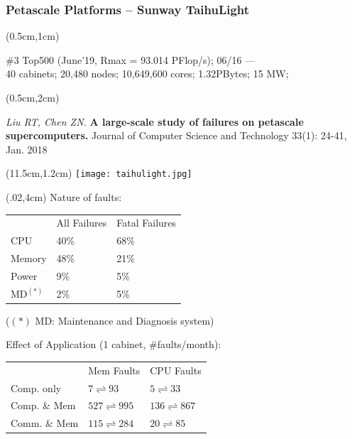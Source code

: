 \begin{frame}
  \frametitle{Petascale Platforms -- Sunway TaihuLight}

  \begin{textblock*}{10cm}(0.5cm,1cm)
    \begin{block}{}
      \footnotesize \#3 Top500 (June'19, Rmax = 93.014 PFlop/s);
     06/16 --- \\
     40 cabinets; 20,480 nodes; 10,649,600 cores; 1.32PBytes; 15 MW; 
    \end{block}
  \end{textblock*}
    
  \begin{textblock*}{10cm}(0.5cm,2cm)
    \begin{exampleblock}{}
     \footnotesize \emph{Liu RT, Chen ZN.} \textbf{A large-scale study of failures on
     petascale supercomputers.} Journal of Computer Science and
   Technology 33(1): 24-41, Jan. 2018
    \end{exampleblock}
  \end{textblock*}

  \begin{textblock*}{4cm}(11.5cm,1.2cm) %
    \texttt{[image: taihulight.jpg]}
  \end{textblock*}

  \begin{textblock*}{.5\linewidth}(.02\linewidth,4cm)
    \footnotesize Nature of faults:
    \begin{tabular}{lll}
                & All Failures & Fatal Failures\\
      CPU       & 40\%         & 68\% \\
      Memory    & 48\%         & 21\% \\
      Power     & 9\%          & 5\%\\
      MD$^{(*)}$ & 2\%          & 5\% \\
    \end{tabular}

    {\scriptsize ($(*)$ MD: Maintenance and Diagnosis system)}

    \medskip
    Effect of Application (1 cabinet, \#faults/month):
    \begin{tabular}{lll}
                     & Mem Faults                   & CPU Faults \\
        Comp. only   & $7 \rightleftharpoons 93$    & $5 \rightleftharpoons 33$ \\
        Comp. \& Mem & $527 \rightleftharpoons 995$ & $136 \rightleftharpoons 867$ \\
        Comm. \& Mem & $115 \rightleftharpoons 284$ & $20 \rightleftharpoons 85$
    \end{tabular}
  \end{textblock*}


\end{frame}

